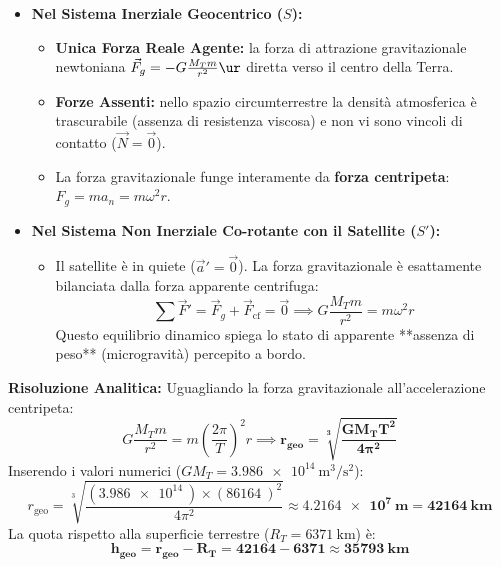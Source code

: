 \begin{tcolorbox}[enhanced, breakable, colback=forestgreen!5!white, colframe=forestgreen!80!black,
    title={\textbf{Analisi delle Forze nei Riferimenti Inerziale e Non Inerziale}}, fonttitle=\bfseries\sffamily]
\begin{itemize}
    \item \textbf{Nel Sistema Inerziale Geocentrico ($S$):}
    \begin{itemize}
        \item \textbf{Unica Forza Reale Agente:} la forza di attrazione gravitazionale newtoniana $\vec{F}_g = -G\frac{M_T m}{r^2}\ur$ diretta verso il centro della Terra.
        \item \textbf{Forze Assenti:} nello spazio circumterrestre la densità atmosferica è trascurabile (assenza di resistenza viscosa) e non vi sono vincoli di contatto ($\vec{N} = \vec{0}$).
        \item La forza gravitazionale funge interamente da \textbf{forza centripeta}: $F_g = m a_n = m \omega^2 r$.
    \end{itemize}
    \item \textbf{Nel Sistema Non Inerziale Co-rotante con il Satellite ($S'$):}
    \begin{itemize}
        \item Il satellite è in quiete ($\vec{a}' = \vec{0}$). La forza gravitazionale è esattamente bilanciata dalla forza apparente centrifuga:
        \begin{equation}
            \sum \vec{F}' = \vec{F}_g + \vec{F}_{\text{cf}} = \vec{0} \implies G\frac{M_T m}{r^2} = m\omega^2 r
        \end{equation}
        Questo equilibrio dinamico spiega lo stato di apparente **assenza di peso** (microgravità) percepito a bordo.
    \end{itemize}
\end{itemize}
\end{tcolorbox}

\textbf{Risoluzione Analitica:}
Uguagliando la forza gravitazionale all'accelerazione centripeta:
\begin{equation}
    G\frac{M_T m}{r^2} = m \left(\frac{2\pi}{T}\right)^2 r \implies \mathbf{r_{\text{geo}} = \sqrt[3]{\frac{G M_T T^2}{4\pi^2}}}
\end{equation}
Inserendo i valori numerici ($G M_T = \SI{3.986e14}{\metre\cubed\per\second\squared}$):
\begin{equation}
    r_{\text{geo}} = \sqrt[3]{\frac{(\SI{3.986e14}{})\times (\SI{86164}{})^2}{4\pi^2}} \approx \mathbf{\SI{4.2164e7}{\metre} = \SI{42164}{\kilo\metre}}
\end{equation}
La quota rispetto alla superficie terrestre ($R_T = \SI{6371}{\kilo\metre}$) è:
\begin{equation}
    \mathbf{h_{\text{geo}} = r_{\text{geo}} - R_T = 42164 - 6371 \approx \SI{35793}{\kilo\metre}}
\end{equation}
